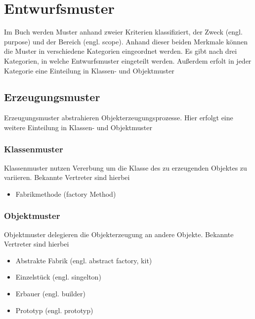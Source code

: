 
\chapter{Entwurfsmuster}
	Im Buch \cite{gamma1994design} werden Muster anhand zweier Kriterien klassifiziert, der Zweck (engl. purpose) und der Bereich (engl. scope). Anhand dieser beiden Merkmale können die Muster in verschiedene Kategorien eingeordnet werden. Es gibt nach \cite{gamma1994design} drei Kategorien, in welche Entwurfsmuster eingeteilt werden. Außerdem erfolt in jeder Kategorie eine Einteilung in Klassen- und Objektmuster
		
		\section{Erzeugungsmuster}
		Erzeugungsmuster abstrahieren Objekterzeugungsprozesse. Hier erfolgt eine weitere Einteilung in Klassen- und Objektmuster
			
			\subsection{Klassenmuster}
			Klassenmuster nutzen Vererbung um die Klasse des zu erzeugenden Objektes zu variieren. Bekannte Vertreter sind hierbei
			\begin{itemize}
				\item Fabrikmethode (factory Method)
			\end{itemize}
			
			\subsection{Objektmuster}
			Objektmuster delegieren die Objekterzeugung an andere Objekte. Bekannte Vertreter sind hierbei
			\begin{itemize}
				\item Abstrakte Fabrik (engl. abstract factory, kit)
				\item Einzelstück (engl. singelton)
				\item Erbauer (engl. builder)
				\item Prototyp (engl. prototyp)
			\end{itemize}

